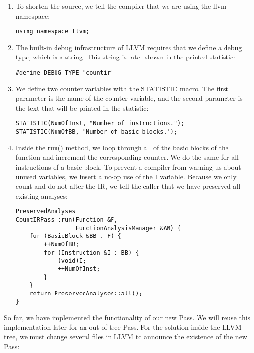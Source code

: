 \begin{enumerate}
\item To shorten the source, we tell the compiler that we are using the llvm namespace:
\begin{lstlisting}[caption={}]
using namespace llvm;
\end{lstlisting}

\item The built-in debug infrastructure of LLVM requires that we define a debug type, which is a string. This string is later shown in the printed statistic:
\begin{lstlisting}[caption={}]
#define DEBUG_TYPE "countir"
\end{lstlisting}

\item We define two counter variables with the STATISTIC macro. The first parameter is the name of the counter variable, and the second parameter is the text that will be printed in the statistic:
\begin{lstlisting}[caption={}]
STATISTIC(NumOfInst, "Number of instructions.");
STATISTIC(NumOfBB, "Number of basic blocks.");
\end{lstlisting}

\item Inside the run() method, we loop through all of the basic blocks of the function and increment the corresponding counter. We do the same for all instructions of a basic block. To prevent a compiler from warning us about unused variables, we insert a no-op use of the I variable. Because we only count and do not alter the IR, we tell the caller that we have preserved all existing analyses:
\begin{lstlisting}[caption={}]
PreservedAnalyses
CountIRPass::run(Function &F,
				 FunctionAnalysisManager &AM) {
	for (BasicBlock &BB : F) {
		++NumOfBB;
		for (Instruction &I : BB) {
			(void)I;
			++NumOfInst;
		}
	}
	return PreservedAnalyses::all();
}
\end{lstlisting}

\end{enumerate}

So far, we have implemented the functionality of our new Pass. We will reuse this implementation later for an out-of-tree Pass. For the solution inside the LLVM tree, we must change several files in LLVM to announce the existence of the new Pass:\par

